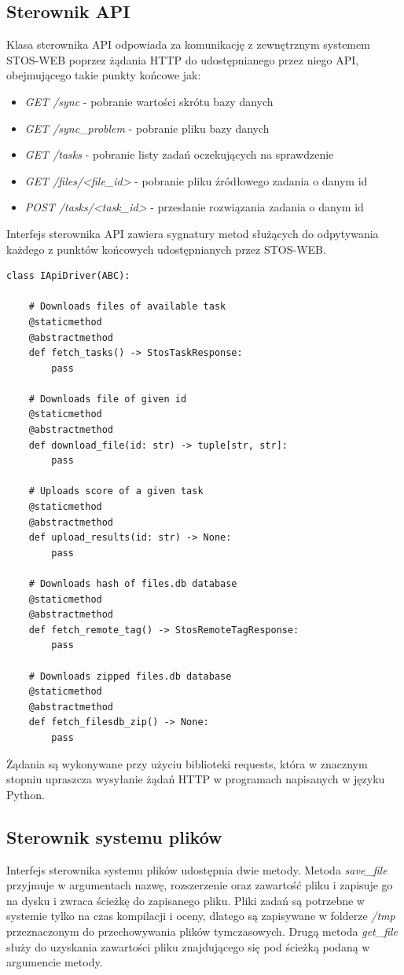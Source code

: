 \subsection{Sterownik API}
Klasa sterownika API odpowiada za komunikację z zewnętrznym systemem STOS-WEB poprzez żądania HTTP do udostępnianego przez niego API, obejmującego takie punkty końcowe jak:
\begin{itemize}
    \item \textit{GET /sync} - pobranie wartości skrótu bazy danych
    \item \textit{GET /sync\_problem} - pobranie pliku bazy danych
    \item \textit{GET /tasks} - pobranie listy zadań oczekujących na sprawdzenie
    \item \textit{GET /files/<file\_id>} - pobranie pliku źródłowego zadania o danym id
    \item \textit{POST /tasks/<task\_id>} - przesłanie rozwiązania zadania o danym id
\end{itemize}
Interfejs sterownika API zawiera sygnatury metod służących do odpytywania każdego z punktów końcowych udostępnianych przez STOS-WEB.
\lstset{style=python}
\begin{lstlisting}[caption = {Interfejs sterownika API.}]
    class IApiDriver(ABC):

    # Downloads files of available task
    @staticmethod
    @abstractmethod
    def fetch_tasks() -> StosTaskResponse:
        pass

    # Downloads file of given id
    @staticmethod
    @abstractmethod
    def download_file(id: str) -> tuple[str, str]:
        pass

    # Uploads score of a given task
    @staticmethod
    @abstractmethod
    def upload_results(id: str) -> None:
        pass

    # Downloads hash of files.db database
    @staticmethod
    @abstractmethod
    def fetch_remote_tag() -> StosRemoteTagResponse: 
        pass

    # Downloads zipped files.db database
    @staticmethod
    @abstractmethod
    def fetch_filesdb_zip() -> None:
        pass
\end{lstlisting}
Żądania są wykonywane przy użyciu biblioteki requests\cite{pythonRequests}, która w znacznym stopniu upraszcza wysyłanie żądań HTTP w programach napisanych w języku Python.

\subsection{Sterownik systemu plików}
Interfejs sterownika systemu plików udostępnia dwie metody. Metoda \textit{save\_file} przyjmuje w argumentach nazwę, rozszerzenie oraz zawartość pliku i zapisuje go na dysku i zwraca ścieżkę do zapisanego pliku. Pliki zadań są potrzebne w systemie tylko na czas kompilacji i oceny, dlatego są zapisywane w folderze \textit{/tmp} przeznaczonym do przechowywania plików tymczasowych. Drugą metoda \textit{get\_file} służy do uzyskania zawartości pliku znajdującego się pod ścieżką podaną w argumencie metody.

